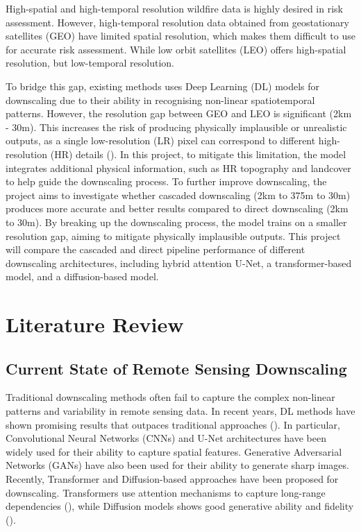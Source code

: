 \documentclass[a4paper, 11pt]{article}
\begin{document}
High-spatial and high-temporal resolution wildfire data is highly desired in risk assessment. However, high-temporal resolution data obtained from geostationary satellites (GEO) have limited spatial resolution, which makes them difficult to use for accurate risk assessment. While low orbit satellites (LEO) offers high-spatial resolution, but low-temporal resolution.

To bridge this gap, existing methods uses Deep Learning (DL) models for downscaling due to their ability in recognising non-linear spatiotemporal patterns. However, the resolution gap between GEO and LEO is significant (2km - 30m). This increases the risk of producing physically implausible or unrealistic outputs, as a single low-resolution (LR) pixel can correspond to different high-resolution (HR) details (\cite{wangDeepLearningImage2020}). In this project, to mitigate this limitation, the model integrates additional physical information, such as HR topography and landcover to help guide the downscaling process. To further improve downscaling, the project aims to investigate whether cascaded downscaling (2km to 375m to 30m) produces more accurate and better results compared to direct downscaling (2km to 30m). By breaking up the downscaling process, the model trains on a smaller resolution gap, aiming to mitigate physically implausible outputs. This project will compare the cascaded and direct pipeline performance of different downscaling architectures, including hybrid attention U-Net, a transformer-based model, and a diffusion-based model.

\section{Literature Review}
\subsection{Current State of Remote Sensing Downscaling}
Traditional downscaling methods often fail to capture the complex non-linear patterns and variability in remote sensing data. In recent years, DL methods have shown promising results that outpaces traditional approaches (\cite{sdrakaDeepLearningDownscaling2022}). In particular, Convolutional Neural Networks (CNNs) and U-Net architectures have been widely used for their ability to capture spatial features. Generative Adversarial Networks (GANs) have also been used for their ability to generate sharp images. Recently, Transformer and Diffusion-based approaches have been proposed for downscaling. Transformers use attention mechanisms to capture long-range dependencies (\cite{wangVGGTVisualGeometry2025}), while Diffusion models shows good generative ability and fidelity (\cite{wangSinSRDiffusionBasedImage2023}).
\end{document}
